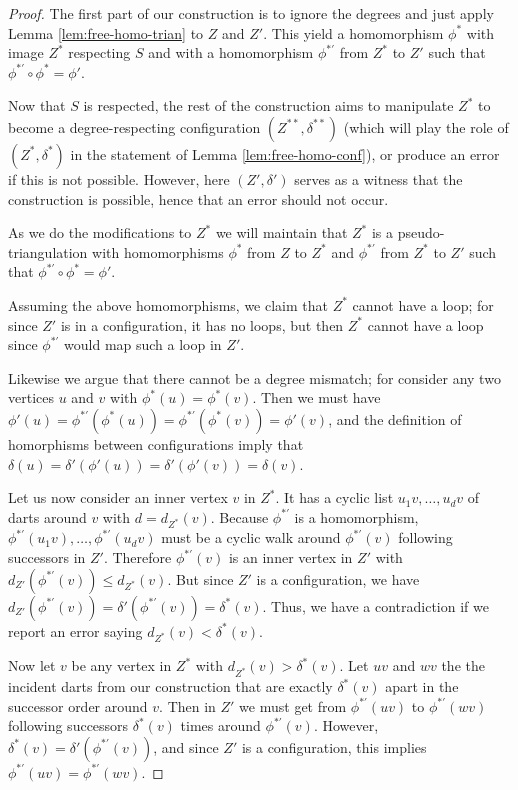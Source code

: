 \documentclass[10pt,a4paper]{amsart}
\begin{document}
\begin{proof}
The first part of our construction is to ignore the degrees and just apply Lemma \ref{lem:free-homo-trian} to $Z$ and $Z'$. This yield a homomorphism $\phi^*$ with  image $Z^*$ respecting $S$ and with a homomorphism $\phi^{*\prime}$ from 
$Z^*$ to $Z'$ such that
$\phi^{*\prime}\circ\phi^*=\phi'$.

Now that $S$ is respected, the rest of the construction
aims to manipulate $Z^*$ to become a degree-respecting configuration 
$(Z^{**},\delta^{**})$ (which will play the role of $(Z^*,\delta^*)$ in the statement of Lemma \ref{lem:free-homo-conf}), 
or produce an error if this is not possible. However, here $(Z',\delta')$ serves as a witness that the construction is possible, hence that an error should not occur.

As we do the modifications to $Z^*$
we will maintain that $Z^*$
is a pseudo-triangulation with homomorphisms $\phi^*$ from $Z$ to $Z^*$ and $\phi^{*\prime}$ from $Z^*$ to $Z'$ such that
$\phi^{*\prime}\circ \phi^*=\phi'$.

Assuming the above homomorphisms, we claim that  $Z^*$ cannot have a loop; for since $Z'$ is in a configuration, it has no loops, but then $Z^*$ cannot have a loop
since $\phi^{*\prime}$ would map such a loop in $Z'$.

Likewise we argue that there cannot be a degree mismatch; for consider
any two vertices $u$ and $v$ with $\phi^*(u)=\phi^*(v)$. Then we must
have $\phi'(u)=
\phi^{*\prime}(\phi^*(u))=
\phi^{*\prime}(\phi^*(v))=\phi'(v)$, and the definition of homorphisms between configurations imply that 
$\delta(u)=\delta'(\phi'(u))=\delta'(\phi'(v))=\delta(v)$.


Let us now consider an inner vertex $v$ in 
$Z^*$. It has a cyclic list $u_1v,\ldots,u_dv$ of darts around $v$ with
$d=d_{Z^*}(v)$. Because $\phi^{*\prime}$ is a homomorphism, $\phi^{*\prime}(u_1v),\ldots,\phi^{*\prime}(u_dv)$ must be a cyclic walk around $\phi^{*\prime}(v)$ following successors in $Z'$. Therefore $\phi^{*\prime}(v)$ is an inner vertex in $Z'$ with $d_{Z'}(\phi^{*\prime}(v))\leq d_{Z^*}(v)$. But since $Z'$ is a configuration, we have $d_{Z'}(\phi^{*\prime}(v))=\delta'(\phi^{*\prime}(v))=\delta^*(v)$. Thus, we have a contradiction 
if we report an
error saying $d_{Z^*}(v)<\delta^*(v)$.

Now let $v$ be any vertex in 
$Z^*$ with $d_{Z^*}(v)>\delta^*(v)$. Let $uv$ and $wv$ the the incident darts from our construction that are exactly $\delta^*(v)$ apart in the successor order around $v$.
Then in $Z'$ we must get from $\phi^{*\prime}(uv)$ to $\phi^{*\prime}(wv)$
following successors $\delta^*(v)$ times around $\phi^{*\prime}(v)$. However, $\delta^*(v)=\delta'(\phi^{*\prime}(v))$, and since $Z'$ is a configuration, this implies  $\phi^{*\prime}(uv)=\phi^{*\prime}(wv)$.


\end{proof}
\end{document}
